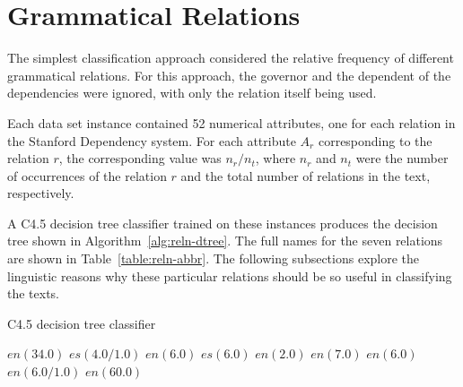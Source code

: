 \documentclass[main.tex]{subfiles}
\begin{document}
\section{Grammatical Relations}

The simplest classification approach considered the relative frequency of different grammatical relations. For this approach, the governor and the dependent of the dependencies were ignored, with only the relation itself being used. 

Each data set instance contained 52 numerical attributes, one for each relation in the Stanford Dependency system. For each attribute \(A_r\) corresponding to the relation \(r\), the corresponding value was \(n_r/n_t\), where \(n_r\) and \(n_t\) were the number of occurrences of the relation \(r\) and the total number of relations in the text, respectively.

A C4.5 decision tree classifier trained on these instances produces the decision tree shown in Algorithm~\ref{alg:reln-dtree}. The full names for the seven relations are shown in Table~\ref{table:reln-abbr}. The following subsections explore the linguistic reasons why these particular relations should be so useful in classifying the texts.

\begin{algorithm}[htbp]
\begin{spacing}{1.0}
\caption{C4.5 decision tree classifier}
{\footnotesize
\begin{algorithmic}
      \STATE $en (34.0)$
    \ELSE %
        \STATE $es (4.0/1.0)$
      \ELSE %
        \STATE $en (6.0)$
      \ENDIF %
    \ENDIF %
  \ELSE %
        \STATE $es (6.0)$
      \ELSE %
        \STATE $en (2.0)$
      \ENDIF
    \ELSE %
      \STATE $en (7.0)$
    \ENDIF %
  \ENDIF %
\ELSE
    \STATE $en (6.0)$
  \ELSE %
      \STATE $en (6.0/1.0)$
    \ELSE %
      \STATE $en (60.0)$
    \ENDIF
  \ENDIF
\ENDIF %
\end{algorithmic}
}
\label{alg:reln-dtree}
\end{spacing}
\end{algorithm}
\end{document}
